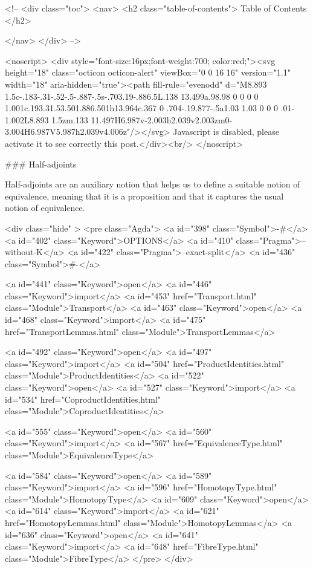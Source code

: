   <!-- 
  <div class="toc">
    <nav>
    <h2 class="table-of-contents"> Table of Contents </h2>
      

    </nav>
  </div>
   -->

  <noscript>
  <div style="font-size:16px;font-weight:700; color:red;"><svg height="18" class="octicon octicon-alert" viewBox="0 0 16 16" version="1.1" width="18" aria-hidden="true"><path fill-rule="evenodd" d="M8.893 1.5c-.183-.31-.52-.5-.887-.5s-.703.19-.886.5L.138 13.499a.98.98 0 0 0 0 1.001c.193.31.53.501.886.501h13.964c.367 0 .704-.19.877-.5a1.03 1.03 0 0 0 .01-1.002L8.893 1.5zm.133 11.497H6.987v-2.003h2.039v2.003zm0-3.004H6.987V5.987h2.039v4.006z"/></svg> Javascript is disabled, please activate it to see correctly this post.</div><br/>
  </noscript>

  ### Half-adjoints

Half-adjoints are an auxiliary notion that helps us to define a suitable notion
of equivalence, meaning that it is a proposition and that it captures the usual
notion of equivalence.

<div class="hide" >
<pre class="Agda">
<a id="398" class="Symbol">{-#</a> <a id="402" class="Keyword">OPTIONS</a> <a id="410" class="Pragma">--without-K</a> <a id="422" class="Pragma">--exact-split</a> <a id="436" class="Symbol">#-}</a>

<a id="441" class="Keyword">open</a> <a id="446" class="Keyword">import</a> <a id="453" href="Transport.html" class="Module">Transport</a>
<a id="463" class="Keyword">open</a> <a id="468" class="Keyword">import</a> <a id="475" href="TransportLemmas.html" class="Module">TransportLemmas</a>

<a id="492" class="Keyword">open</a> <a id="497" class="Keyword">import</a> <a id="504" href="ProductIdentities.html" class="Module">ProductIdentities</a>
<a id="522" class="Keyword">open</a> <a id="527" class="Keyword">import</a> <a id="534" href="CoproductIdentities.html" class="Module">CoproductIdentities</a>

<a id="555" class="Keyword">open</a> <a id="560" class="Keyword">import</a> <a id="567" href="EquivalenceType.html" class="Module">EquivalenceType</a>

<a id="584" class="Keyword">open</a> <a id="589" class="Keyword">import</a> <a id="596" href="HomotopyType.html" class="Module">HomotopyType</a>
<a id="609" class="Keyword">open</a> <a id="614" class="Keyword">import</a> <a id="621" href="HomotopyLemmas.html" class="Module">HomotopyLemmas</a>
<a id="636" class="Keyword">open</a> <a id="641" class="Keyword">import</a> <a id="648" href="FibreType.html" class="Module">FibreType</a>
</pre>
</div>

